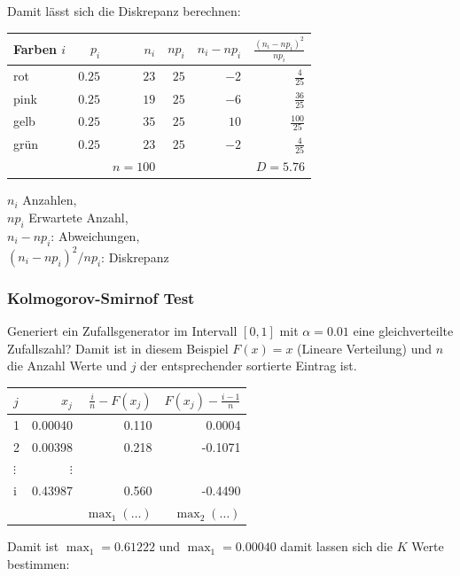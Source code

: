 Damit lässt sich die Diskrepanz berechnen:\\
\begin{center}
	\begin{tabular}{l|rrrrr|}
	Farben $i$ & $p_i$ & $n_i$ & $np_i$ & $n_i - np_i$ & $\frac{(n_i - np_i)^2}{np_i}$ \\ \toprule
	rot & $0.25$ & $23$ & $25$ & $-2$ & $\frac{4}{25}$ \\  \midrule
	pink & $0.25$ & $19$ & $25$ & $-6$ & $\frac{36}{25}$ \\ \midrule
	gelb & $0.25$ & $35$ & $25$ & $10$ & $\frac{100}{25}$ \\ \midrule
	grün & $0.25$ & $23$ & $25$ & $-2$ & $\frac{4}{25}$ \\ \midrule
	& & $n=100$ & & & $D =5.76$ \\ \bottomrule
\end{tabular}
\end{center}

\noindent
$n_i$ Anzahlen, \\
$np_i$ Erwartete Anzahl,  \\
$n_i - np_i$: Abweichungen, \\
$(n_i - np_i)^2/np_i$: Diskrepanz

\subsubsection{Kolmogorov-Smirnof Test}\label{Kolmogorov}
Generiert ein Zufallsgenerator im Intervall $[0, 1]$ mit $\alpha=0.01$ eine gleichverteilte Zufallszahl? Damit ist in diesem Beispiel $F(x) = x$ (Lineare Verteilung) und $n$ die Anzahl Werte und $j$ der entsprechender sortierte Eintrag ist.
\begin{center}
	\begin{tabular}{l|r|r|r}
		$j$ & $x_j$ & $\frac{i}{n}-F(x_j)$ & $F(x_j) - \frac{i-1}{n}$ \\ \toprule
		1 & 0.00040 & 0.110 & 0.0004  \\  \midrule
		2& 0.00398 & 0.218 & -0.1071 \\  \midrule
		$\vdots$ & $\vdots$& &  \\  \midrule
		i & 0.43987 & 0.560 &-0.4490 \\ \bottomrule
		& & $\max_1(\dots)$ & $\max_2(\dots)$
	\end{tabular}
\end{center}

Damit ist $\max_1 = 0.61222$ und  $\max_1 = 0.00040$ damit lassen sich die $K$ Werte bestimmen:

